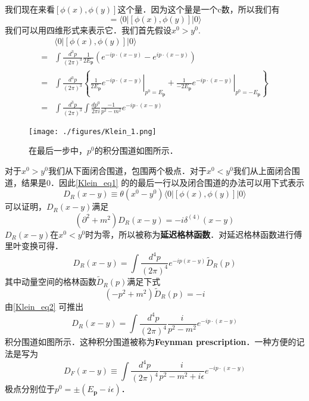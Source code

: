 
我们现在来看$[\phi(x),\phi(y)]$这个量．因为这个量是一个c数，所以我们有
\begin{equation}
[\phi(x),\phi(y)] = \langle 0 | [\phi(x),\phi(y)] | 0 \rangle
\end{equation}
我们可以用四维形式来表示它．我们首先假设$x^0>y^0$.
\begin{equation}\label{Klein_eq1}
\begin{aligned}
& \langle 0|[\phi(x), \phi(y)]| 0\rangle\\
=&\int \frac{d^{3} p}{(2 \pi)^{3}} \frac{1}{2 E_{\mathbf{p}}}\left(e^{-i p \cdot(x-y)}-e^{i p \cdot(x-y)}\right) \\ 
=& \int \frac{d^{3} p}{(2 \pi)^{3}}\left\{\left.\frac{1}{2 E_{\mathbf{p}}} e^{-i p \cdot(x-y)}\right|_{p^{0}=E_{\mathbf{p}}}+\left.\frac{1}{-2 E_{\mathbf{p}}} e^{-i p \cdot(x-y)}\right|_{p^{0}=-E_{\mathbf{p}}}\right\} \\
=& \int \frac{d^{3} p}{(2 \pi)^{3}} \int \frac{d p^{0}}{2 \pi i} \frac{-1}{p^{2}-m^{2}} e^{-i p \cdot(x-y)} 
\end{aligned}
\end{equation}
\begin{figure}[ht]
\centering
\texttt{[image: ./figures/Klein\_1.png]}
\caption{在最后一步中，$p^0$的积分围道如图所示．} \label{Klein_fig1}
\end{figure}
对于$x^0>y^0$我们从下面闭合围道，包围两个极点．对于$x^0<y^0$我们从上面闭合围道，结果是0．因此\autoref{Klein_eq1} 的的最后一行以及闭合围道的办法可以用下式表示
\begin{equation}
D_R(x-y)\equiv \theta(x^0-y^0)\langle 0 | [\phi(x),\phi(y)]|0 \rangle
\end{equation}
可以证明，$D_R(x-y)$满足
\begin{equation}
(\partial^2+m^2)D_R(x-y) = -i \delta^{(4)}(x-y)
\end{equation}
$D_R(x-y)$在$x^0<y^0$时为零，所以被称为\textbf{延迟格林函数}．对延迟格林函数进行傅里叶变换可得．
\begin{equation}
D_R(x-y) = \int \frac{d^4p}{(2\pi)^4} e^{-ip(x-y)} \tilde D_R (p)
\end{equation}
其中动量空间的格林函数$\tilde D_R(p)$满足下式
\begin{equation}\label{Klein_eq2}
(-p^2+m^2) \tilde D_R(p) = -i
\end{equation}
由\autoref{Klein_eq2} 可推出
\begin{equation}
D_R (x-y) = \int \frac{d^4p}{(2\pi)^4} \frac{i}{p^2-m^2} e^{-ip\cdot(x-y)}
\end{equation}
积分围道如图所示．这种积分围道被称为\textbf{Feynman prescription}．一种方便的记法是写为
\begin{equation}
D_F(x-y) \equiv \int \frac{d^4p}{(2\pi)^4} \frac{i}{p^2-m^2+i\epsilon} e^{-ip\cdot(x-y)}
\end{equation}
极点分别位于$p^0 = \pm(E_{\mathbf p}-i\epsilon)$．
